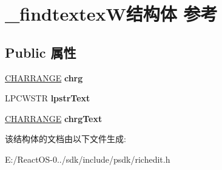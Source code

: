 \hypertarget{struct__findtextex_w}{}\section{\+\_\+findtextex\+W结构体 参考}
\label{struct__findtextex_w}
\subsection*{Public 属性}
\begin{DoxyCompactItemize}
\item 
\mbox{\label{struct__findtextex_w_ad65f2dbfc0518c927f49391826c4d443}} 
\hyperlink{struct__charrange}{C\+H\+A\+R\+R\+A\+N\+GE} {\bfseries chrg}
\item 
\mbox{\label{struct__findtextex_w_af1192cb165531c864aa5b3fd6d08d0b1}} 
L\+P\+C\+W\+S\+TR {\bfseries lpstr\+Text}
\item 
\mbox{\label{struct__findtextex_w_adfe05e826ebf7e46cd64ca490f6c510e}} 
\hyperlink{struct__charrange}{C\+H\+A\+R\+R\+A\+N\+GE} {\bfseries chrg\+Text}
\end{DoxyCompactItemize}


该结构体的文档由以下文件生成\+:\begin{DoxyCompactItemize}
\item 
E\+:/\+React\+O\+S-\/0../sdk/include/psdk/richedit.\+h\end{DoxyCompactItemize}
